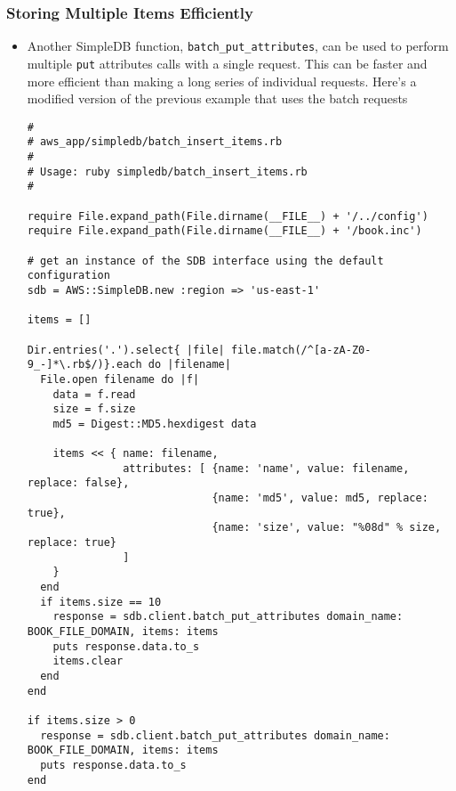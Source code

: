 \documentclass{beamer}
\begin{document}
\begin{frame}
\frametitle{Storing Multiple Items Efficiently}
\begin{itemize}
\item Another SimpleDB function, \texttt{batch\_put\_attributes}, can be used to perform multiple
\texttt{put} attributes calls with a single request. This can be faster and more efficient
than making a long series of individual requests. Here's a modified version of the
previous example that uses the batch requests

\lstset{language=Ruby, style=eclipse}
\begin{lstlisting}
#
# aws_app/simpledb/batch_insert_items.rb
#
# Usage: ruby simpledb/batch_insert_items.rb
#

require File.expand_path(File.dirname(__FILE__) + '/../config')
require File.expand_path(File.dirname(__FILE__) + '/book.inc')

# get an instance of the SDB interface using the default configuration
sdb = AWS::SimpleDB.new :region => 'us-east-1'

items = []

Dir.entries('.').select{ |file| file.match(/^[a-zA-Z0-9_-]*\.rb$/)}.each do |filename|
  File.open filename do |f|
    data = f.read
    size = f.size
    md5 = Digest::MD5.hexdigest data

    items << { name: filename,
               attributes: [ {name: 'name', value: filename, replace: false},
                             {name: 'md5', value: md5, replace: true},
                             {name: 'size', value: "%08d" % size, replace: true}
               ]
    }
  end
  if items.size == 10
    response = sdb.client.batch_put_attributes domain_name: BOOK_FILE_DOMAIN, items: items
    puts response.data.to_s
    items.clear
  end
end

if items.size > 0
  response = sdb.client.batch_put_attributes domain_name: BOOK_FILE_DOMAIN, items: items
  puts response.data.to_s
end
\end{lstlisting}
\end{itemize}
\end{frame}
\end{document}

